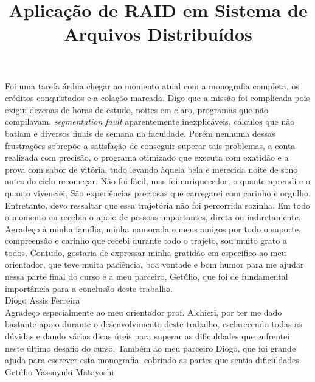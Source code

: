 \documentclass[bacharelado]{unb-cic}
\title{Aplicação de RAID em Sistema de Arquivos Distribuídos}
\begin{document}
\maketitle

\pretextual

\begin{agradecimentos}
Foi uma tarefa árdua chegar ao momento atual com a monografia completa, os créditos conquistados e a colação marcada. Digo que a missão foi complicada pois exigiu dezenas de horas de estudo, noites em claro, programas que não compilavam, \textit{segmentation fault} aparentemente inexplicáveis, cálculos que não batiam e diversos finais de semana na faculdade. Porém nenhuma dessas frustrações sobrepõe a satisfação de conseguir superar tais problemas, a conta realizada com precisão, o programa otimizado que executa com exatidão e a prova com sabor de vitória, tudo levando àquela bela e merecida noite de sono antes do ciclo recomeçar. Não foi fácil, mas foi enriquecedor, o quanto aprendi e o quanto vivenciei. São experiências preciosas que carregarei com carinho e orgulho. Entretanto, devo ressaltar que essa trajetória não foi percorrida sozinha. Em todo o momento eu recebia  o apoio de pessoas importantes, direta ou indiretamente. Agradeço à minha família, minha namorada e meus amigos por todo o suporte, compreensão e carinho que recebi durante todo o trajeto, sou muito grato a todos. Contudo, gostaria de expressar minha gratidão em especifico ao meu orientador, que teve muita paciência, boa vontade e bom humor para me ajudar nessa parte final do curso e a meu parceiro, Getúlio, que foi de fundamental importância para a conclusão deste trabalho.
\\

Diogo Assis Ferreira
\\

Agradeço especialmente ao meu orientador prof. Alchieri, por ter me dado bastante apoio durante o desenvolvimento deste trabalho, esclarecendo todas as dúvidas e dando várias dicas úteis para superar as dificuldades que enfrentei neste último desafio do curso. Também ao meu parceiro Diogo, que foi grande ajuda para escrever esta monografia, cobrindo as partes que sentia dificuldades.
\\

Getúlio Yassuyuki Matayoshi
\\

\end{agradecimentos}
\end{document}
